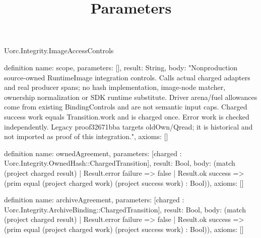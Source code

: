 \begin{lexlean}{Uorc.Integrity.ImageAccessControls}
\title{Parameters}
\begin{semanticmodule}
definition{
  name: scope,
  parameters: [],
  result: String,
  body: "Nonproduction source-owned RuntimeImage integration controls. Calls actual charged adapters and real producer spans; no hash implementation, image-node matcher, ownership normalization or SDK runtime substitute. Driver arena/fuel allowances come from existing BindingControls and are not semantic input caps. Charged success work equals Transition.work and is charged once. Error work is checked independently. Legacy proof32671bba targets oldOwn/Qread; it is historical and not imported as proof of this integration.",
  axioms: []
}

definition{
  name: ownedAgreement,
  parameters: [charged : Uorc.Integrity.OwnedHash::ChargedTransition],
  result: Bool,
  body: (match (project charged result)
    | Result.error failure => false
    | Result.ok success => (prim equal (project charged work) (project success work) : Bool)),
  axioms: []
}

definition{
  name: archiveAgreement,
  parameters: [charged : Uorc.Integrity.ArchiveBinding::ChargedTransition],
  result: Bool,
  body: (match (project charged result)
    | Result.error failure => false
    | Result.ok success => (prim equal (project charged work) (project success work) : Bool)),
  axioms: []
}


\end{semanticmodule}
\end{lexlean}
